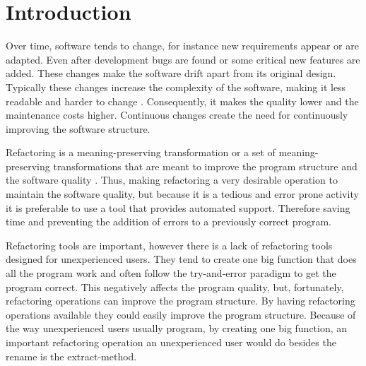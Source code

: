 
% 
% 

\section{Introduction}


Over time, software tends to change, for instance new requirements appear or are adapted. 
Even after development bugs are found or some critical new features are added.
These changes make the software drift apart from its original design.
Typically these changes increase the complexity of the software, making it less readable and harder to change \cite{mens2003refactoring}. 
Consequently, it makes the quality lower and the maintenance costs higher.
Continuous changes create the need for continuously improving the software structure.

Refactoring is a meaning-preserving transformation or a set of meaning-preserving transformations that are meant to improve the program structure and the software quality \cite{bourquin2007high}.
Thus, making refactoring a very desirable operation to maintain the software quality, but because it is a tedious and error prone activity it is preferable to use a tool that provides automated support. 
Therefore saving time and preventing the addition of errors to a previously correct program.

%
Refactoring tools are important, however there is a lack of refactoring tools designed for unexperienced users.
They tend to create one big function that does all the program work and often follow the try-and-error paradigm to get the program correct.
This negatively affects the program quality, but, fortunately, refactoring operations can improve the program structure.
By having refactoring operations available they could easily improve the program structure.
Because of the way unexperienced users usually program, by creating one big function, an important refactoring operation an unexperienced user would do besides the rename is the extract-method.

